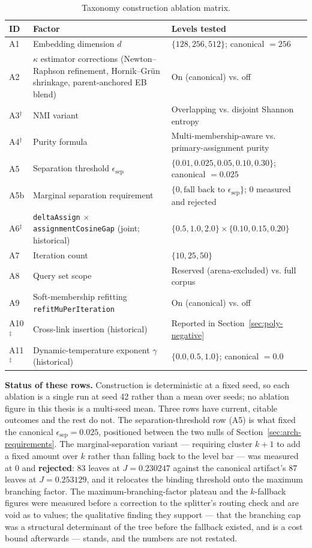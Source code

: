 \begin{table}[h]
\centering
\caption{Taxonomy construction ablation matrix.}
\label{tab:ablations}
\begin{tabular}{p{1.0cm}p{4.2cm}p{7.2cm}}
\toprule
ID & Factor & Levels tested \\
\midrule
A1 & Embedding dimension $d$ & $\{128, 256, 512\}$; canonical $= 256$ \\
A2 & $\kappa$ estimator corrections (Newton--Raphson refinement, Hornik--Gr\"un shrinkage, parent-anchored EB blend) & On (canonical) vs. off \\
A3$^\dagger$ & NMI variant & Overlapping vs. disjoint Shannon entropy \\
A4$^\dagger$ & Purity formula & Multi-membership-aware vs. primary-assignment purity \\
A5 & Separation threshold $\epsilon_{\text{sep}}$ & $\{0.01, 0.025, 0.05, 0.10, 0.30\}$; canonical $= 0.025$ \\
A5b & Marginal separation requirement & $\{0, \text{fall back to } \epsilon_{\text{sep}}\}$; $0$ measured and rejected \\
A6$^\ddagger$ & \texttt{deltaAssign} $\times$ \texttt{assignmentCosineGap} (joint; historical) & $\{0.5,1.0,2.0\} \times \{0.10,0.15,0.20\}$ \\
A7 & Iteration count & $\{10, 25, 50\}$ \\
A8 & Query set scope & Reserved (arena-excluded) vs. full corpus \\
A9 & Soft-membership refitting \texttt{refitMuPerIteration} & On (canonical) vs. off \\
A10$^\ddagger$ & Cross-link insertion (historical) & Reported in Section~\ref{sec:poly-negative} \\
A11$^\ddagger$ & Dynamic-temperature exponent $\gamma$ (historical) & $\{0.0, 0.5, 1.0\}$; canonical $= 0.0$ \\
\bottomrule
\end{tabular}
\end{table}

\textbf{Status of these rows.} Construction is deterministic at a fixed
seed, so each ablation is a single run at seed 42 rather than a mean
over seeds; no ablation figure in this thesis is a multi-seed mean.
Three rows have current, citable outcomes and the rest do not.
The separation-threshold row (A5) is what fixed the canonical
$\epsilon_{\text{sep}} = 0.025$, positioned between the two nulls of
Section~\ref{sec:arch-requirements}.
The marginal-separation variant --- requiring cluster $k+1$ to add a
fixed amount over $k$ rather than falling back to the level bar --- was
measured at $0$ and \textbf{rejected}: 83 leaves at $J = 0.230247$
against the canonical artifact's 87 leaves at $J = 0.253129$, and it
relocates the binding threshold onto the maximum branching factor.
The maximum-branching-factor plateau and the $k$-fallback figures were
measured before a correction to the splitter's routing check and are
void as to values; the qualitative finding they support --- that the
branching cap was a structural determinant of the tree before the
fallback existed, and is a cost bound afterwards --- stands, and the
numbers are not restated.

